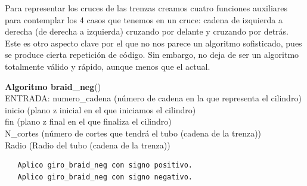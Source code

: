   \bigskip
  Para representar los cruces de las trenzas creamos cuatro funciones auxiliares para contemplar los 4 casos que tenemos en un cruce: cadena de izquierda a derecha (de derecha a izquierda) cruzando por delante y cruzando por detrás. Este es otro aspecto clave por el que no nos parece un algoritmo sofisticado, pues se produce cierta repetición de código. Sin embargo, no deja de ser un algoritmo totalmente válido y rápido, aunque menos que el actual. 
  \begin{alg}
  	\textbf{Algoritmo braid\_neg}()\\
  	ENTRADA: numero\_cadena (número de cadena en la que representa el cilindro)\\
  	\hspace*{2.2cm} inicio (plano z inicial en el que iniciamos el cilindro)\\
  	\hspace*{2.2cm} fin (plano z final en el que finaliza el cilindro)\\
  	\hspace*{2.2cm} N\_cortes (número de cortes que tendrá el tubo (cadena de la trenza))\\
  	\hspace*{2.2cm} Radio (Radio del tubo (cadena de la trenza))
  	
 \begin{lstlisting}
   Aplico giro_braid_neg con signo positivo.
   Aplico giro_braid_neg con signo negativo.  
\end{lstlisting}
  \end{alg}
  
